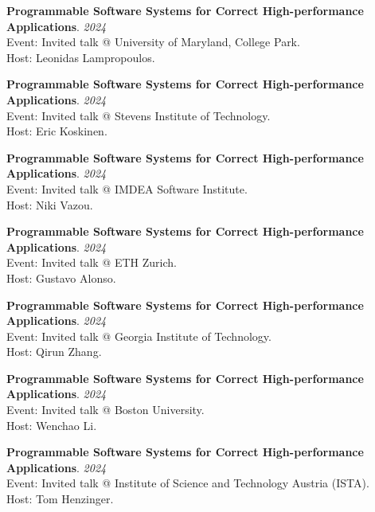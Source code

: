 \begin{minipage}{\textwidth}
\textbf{Programmable Software Systems for Correct High-performance Applications}. \hfill {\em 2024}\\
Event: Invited talk @ University of Maryland, College Park.\\
 Host: Leonidas Lampropoulos.
\end{minipage}

\begin{minipage}{\textwidth}
\textbf{Programmable Software Systems for Correct High-performance Applications}. \hfill {\em 2024}\\
Event: Invited talk @ Stevens Institute of Technology.\\
 Host: Eric Koskinen.
\end{minipage}

\begin{minipage}{\textwidth}
\textbf{Programmable Software Systems for Correct High-performance Applications}. \hfill {\em 2024}\\
Event: Invited talk @ IMDEA Software Institute.\\
 Host: Niki Vazou.
\end{minipage}

\begin{minipage}{\textwidth}
\textbf{Programmable Software Systems for Correct High-performance Applications}. \hfill {\em 2024}\\
Event: Invited talk @ ETH Zurich.\\
 Host: Gustavo Alonso.
\end{minipage}

\begin{minipage}{\textwidth}
\textbf{Programmable Software Systems for Correct High-performance Applications}. \hfill {\em 2024}\\
Event: Invited talk @ Georgia Institute of Technology.\\
 Host: Qirun Zhang.
\end{minipage}

\begin{minipage}{\textwidth}
\textbf{Programmable Software Systems for Correct High-performance Applications}. \hfill {\em 2024}\\
Event: Invited talk @ Boston University.\\
 Host: Wenchao Li.
\end{minipage}

\begin{minipage}{\textwidth}
\textbf{Programmable Software Systems for Correct High-performance Applications}. \hfill {\em 2024}\\
Event: Invited talk @ Institute of Science and Technology Austria (ISTA).\\
 Host: Tom Henzinger.
\end{minipage}

